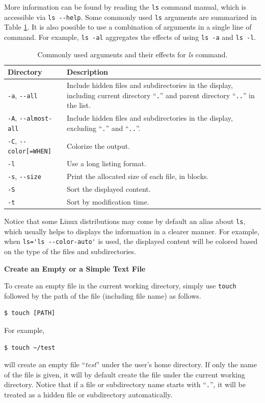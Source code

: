 More information can be found by reading the \verb|ls| command manual, which is accessible via \verb|ls --help|. Some commonly used \verb|ls| arguments are summarized in Table \ref{ch4tab:lscommandargument}. It is also possible to use a combination of arguments in a single line of command. For example, \verb|ls -al| aggregates the effects of using \verb|ls -a| and \verb|ls -l|.

\begin{table}
  \centering \caption{Commonly used arguments and their effects for \textit{ls} command.}\label{ch4tab:lscommandargument}
  \begin{tabularx}{\textwidth}{lX}
    \hline
    Directory & Description \\ \hline
    \verb|-a|, \verb|--all| & Include hidden files and subdirectories in the display, including current directory ``\verb|.|'' and parent directory ``\verb|..|'' in the list. \\ \hdashline
    \verb|-A|, \verb|--almost-all| & Include hidden files and subdirectories in the display, excluding ``\verb|.|'' and ``\verb|..|''. \\ \hdashline
    \verb|-C|, \verb|--color[=WHEN]| & Colorize the output. \\ \hdashline
    \verb|-l| & Use a long listing format. \\ \hdashline
    \verb|-s|, \verb|--size| & Print the allocated size of each file, in blocks. \\ \hdashline
    \verb|-S| & Sort the displayed content. \\ \hdashline
    \verb|-t| & Sort by modification time. \\
    \hline
  \end{tabularx}
\end{table}

Notice that some Linux distributions may come by default an alias about \verb|ls|, which usually helps to displays the information in a clearer manner. For example, when \verb|ls='ls --color-auto'| is used, the displayed content will be colored based on the type of the files and subdirectories.

\textbf{Create an Empty or a Simple Text File}

To create an empty file in the current working directory, simply use \verb|touch| followed by the path of the file (including file name) as follows.
\begin{lstlisting}
$ touch [PATH]
\end{lstlisting}
For example, 
\begin{lstlisting}
$ touch ~/test
\end{lstlisting}
will create an empty file ``\textit{test}'' under the user's home directory. If only the name of the file is given, it will by default create the file under the current working directory. Notice that if a file or subdirectory name starts with ``\verb|.|'', it will be treated as a hidden file or subdirectory automatically.

